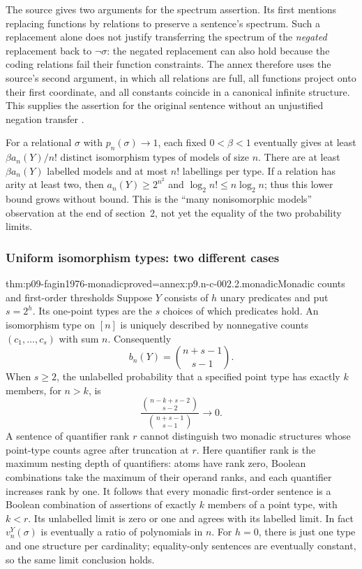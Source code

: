 The source gives two arguments for the spectrum assertion.  Its first
mentions replacing functions by relations to preserve a sentence's
spectrum.  Such a replacement alone does not justify transferring the
spectrum of the \emph{negated} replacement back to \(\neg\sigma\):
the negated replacement can also hold because the coding relations fail
their function constraints.  The annex therefore uses the source's second
argument, in which all relations are full, all functions project onto their
first coordinate, and all constants coincide in a canonical infinite
structure.  This supplies the assertion for the original sentence without
an unjustified negation transfer \cite[cor.~6 and its two proofs, p.~53]{Fagin1976}.

For a relational \(\sigma\) with \(p_n(\sigma)\to1\), each fixed
\(0<\beta<1\) eventually gives at least
\(\beta a_n(Y)/n!\) distinct isomorphism types of models of size \(n\).
There are at least \(\beta a_n(Y)\) labelled models and at most \(n!\)
labellings per type.  If a relation has arity at least two, then
\(a_n(Y)\geq2^{n^2}\) and
\(\log_2 n!\leq n\log_2 n\); thus this lower bound grows without bound.
This is the ``many nonisomorphic models'' observation at the end of
section~2, not yet the equality of the two probability limits.

\subsubsection{Uniform isomorphism types: two different cases}

\begin{hblemma}{thm:p09-fagin1976-monadic}{proved=annex:p9.n-c-002.2.monadic}{Monadic counts and first-order thresholds}
Suppose \(Y\) consists of \(h\) unary predicates and put \(s=2^h\).
Its one-point types are the \(s\) choices of which predicates hold.
An isomorphism type on \([n]\) is uniquely described by nonnegative
counts \((c_1,\ldots,c_s)\) with sum \(n\).  Consequently
\[
 b_n(Y)=\binom{n+s-1}{s-1}.
\]
When \(s\geq2\), the unlabelled probability that a specified point
type has exactly \(k\) members, for \(n>k\), is
\[
 \frac{\binom{n-k+s-2}{s-2}}{\binom{n+s-1}{s-1}}
 \longrightarrow0.
\]
A sentence of quantifier rank \(r\) cannot distinguish two monadic
structures whose point-type counts agree after truncation at \(r\).
Here quantifier rank is the maximum nesting depth of quantifiers:
atoms have rank zero, Boolean combinations take the maximum of their
operand ranks, and each quantifier increases rank by one.
It follows that every monadic first-order sentence is a Boolean
combination of assertions of exactly \(k\) members of a point type,
with \(k<r\).  Its unlabelled limit is zero or one and agrees with
its labelled limit.  In fact \(v_n^Y(\sigma)\) is eventually a ratio
of polynomials in \(n\).  For \(h=0\), there is just one type and
one structure per cardinality; equality-only sentences are eventually
constant, so the same limit conclusion holds.
\end{hblemma}

